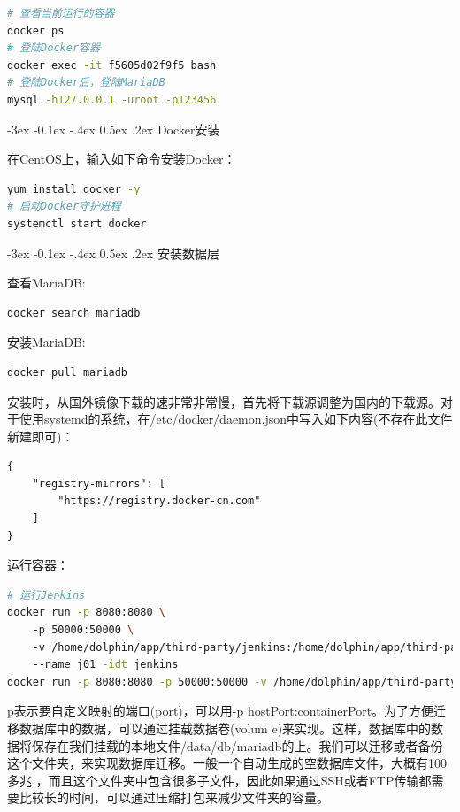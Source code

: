 \documentclass[8pt]{book}
\makeatletter
\numberwithin{dummy}{section}
\theoremstyle{ocrenumbox}
\theoremstyle{blacknumex}
\theoremstyle{blacknumbox}
\theoremstyle{ocrenum}
\renewcommand{\subsection}{\@startsection {subsection}{2}{\z@}
	{-3ex \@plus -0.1ex \@minus -.4ex}
	{0.5ex \@plus.2ex }
	{\normalfont\sffamily\bfseries}}
\makeatother
\begin{document}
\begin{lstlisting}[language=Bash]
# 查看当前运行的容器
docker ps
# 登陆Docker容器
docker exec -it f5605d02f9f5 bash
# 登陆Docker后，登陆MariaDB
mysql -h127.0.0.1 -uroot -p123456
\end{lstlisting}


\subsection{Docker安装}

在CentOS上，输入如下命令安装Docker：

\begin{lstlisting}[language=Bash]
yum install docker -y
# 启动Docker守护进程
systemctl start docker
\end{lstlisting}


\subsection{安装数据层}

查看MariaDB:

\begin{lstlisting}[language=Bash]
docker search mariadb
\end{lstlisting}

安装MariaDB:

\begin{lstlisting}[language=Bash]
docker pull mariadb
\end{lstlisting}

安装时，从国外镜像下载的速非常非常慢，首先将下载源调整为国内的下载源。对于使用systemd的系统，在/etc/docker/daemon.json中写入如下内容(不存在此文件新建即可)：

\begin{lstlisting}
{
	"registry-mirrors": [
		"https://registry.docker-cn.com"
	]
}
\end{lstlisting}

运行容器：

\begin{lstlisting}[language=Bash]
# 运行Jenkins
docker run -p 8080:8080 \ 
	-p 50000:50000 \ 
	-v /home/dolphin/app/third-party/jenkins:/home/dolphin/app/third-party/jenkins/jenkins_home \ 
	--name j01 -idt jenkins
docker run -p 8080:8080 -p 50000:50000 -v /home/dolphin/app/third-party/jenkins:/home/dolphin/app/third-party/jenkins/jenkins_home jenkins
\end{lstlisting}

p表示要自定义映射的端口(port)，可以用-p hostPort:containerPort。为了方便迁移数据库中的数据，可以通过挂载数据卷(volum	e)来实现。这样，数据库中的数据将保存在我们挂载的本地文件/data/db/mariadb的上。我们可以迁移或者备份这个文件夹，来实现数据库迁移。一般一个自动生成的空数据库文件，大概有100多兆 ，而且这个文件夹中包含很多子文件，因此如果通过SSH或者FTP传输都需要比较长的时间，可以通过压缩打包来减少文件夹的容量。
\end{document}
